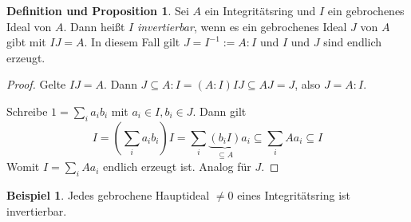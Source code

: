 \documentclass[
twoside=semi,
fontsize=12,
DIV=12, 
cleardoublepage=current,
leqno,
headings=optiontoheadandtoc, 
toc=idx
]{scrbook}
\theoremstyle{definition}
\newtheorem{beispiel}[definition]{Beispiel}
\newtheorem{def-prop}[definition]{Definition und Proposition}
\begin{document}
 	\begin{def-prop}\label{2.2.9}
 		Sei $A$ ein Integrit\"atsring und $I$ ein gebrochenes Ideal von $A$. Dann hei\ss t $I$ \emph{invertierbar}, wenn es ein gebrochenes Ideal $J$ von $A$ gibt mit $IJ = A$. In diesem Fall gilt $J=I^{-1}:=A:I$ und $I$ und $J$ sind endlich erzeugt.
 		
 		\begin{proof}
 			Gelte $IJ = A$. Dann $J \subseteq A:I = (A:I)IJ \subseteq AJ = J$, also $J = A:I$. 
 			
 			Schreibe $1 = \sum_i a_ib_i$ mit $a_i \in I, b_i \in J$. Dann gilt 
 			\[I = (\sum_i a_ib_i)I = \sum_i\underbrace{(b_iI)}_{\subseteq A}a_i \subseteq \sum_i Aa_i \subseteq I\]
 			Womit $I = \sum_i Aa_i$ endlich erzeugt ist. Analog f\"ur $J$.
 		\end{proof}
 	\end{def-prop}
 
 	\begin{beispiel}\label{2.2.10}
 		Jedes gebrochene Hauptideal $\neq 0$ eines Integrit\"atsring ist invertierbar.
 	\end{beispiel}
 
\end{document}

